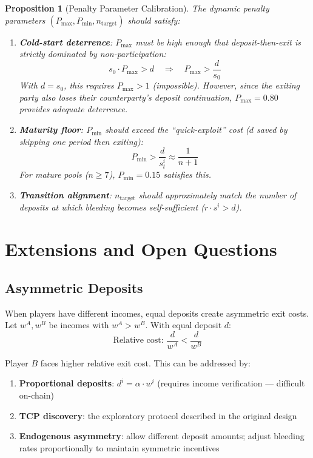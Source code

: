 \documentclass[12pt]{article}
\newtheorem{proposition}{Proposition}
\begin{document}
\begin{proposition}[Penalty Parameter Calibration]
The dynamic penalty parameters $(P_{\max}, P_{\min}, n_{\text{target}})$ should satisfy:
\begin{enumerate}
    \item \textbf{Cold-start deterrence}: $P_{\max}$ must be high enough that deposit-then-exit is strictly dominated by non-participation:
    \[
    s_0 \cdot P_{\max} > d \quad \Rightarrow \quad P_{\max} > \frac{d}{s_0}
    \]
    With $d = s_0$, this requires $P_{\max} > 1$ (impossible). However, since the exiting party also loses their counterparty's deposit continuation, $P_{\max} = 0.80$ provides adequate deterrence.

    \item \textbf{Maturity floor}: $P_{\min}$ should exceed the ``quick-exploit'' cost ($d$ saved by skipping one period then exiting):
    \[
    P_{\min} > \frac{d}{s_t^i} \approx \frac{1}{n+1}
    \]
    For mature pools ($n \geq 7$), $P_{\min} = 0.15$ satisfies this.

    \item \textbf{Transition alignment}: $n_{\text{target}}$ should approximately match the number of deposits at which bleeding becomes self-sufficient ($r \cdot s^i > d$).
\end{enumerate}
\end{proposition}



\section{Extensions and Open Questions}

\subsection{Asymmetric Deposits}

When players have different incomes, equal deposits create asymmetric exit costs. Let $w^A, w^B$ be incomes with $w^A > w^B$. With equal deposit $d$:
\[
\text{Relative cost: } \frac{d}{w^A} < \frac{d}{w^B}
\]

Player $B$ faces higher relative exit cost. This can be addressed by:
\begin{enumerate}
    \item \textbf{Proportional deposits}: $d^i = \alpha \cdot w^i$ (requires income verification --- difficult on-chain)
    \item \textbf{TCP discovery}: the exploratory protocol described in the original design
    \item \textbf{Endogenous asymmetry}: allow different deposit amounts; adjust bleeding rates proportionally to maintain symmetric incentives
\end{enumerate}
\end{document}

